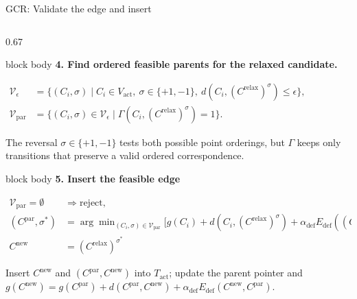 \documentclass[aspectratio=169,10pt]{beamer}
\begin{document}
\begin{frame}[t]{GCR: Validate the edge and insert}
\begin{columns}[T,onlytextwidth]
\begin{column}{0.67\textwidth}
      \vspace{0.035cm}
      \begin{beamercolorbox}[wd=\textwidth,sep=0.07cm]{block body}
        \fontsize{6.4}{6.9}\selectfont
        \textbf{4. Find ordered feasible parents for the relaxed candidate.}\par\vspace{0.2ex}
        \centering
        \(
          \begin{aligned}
            \mathcal V_{\epsilon}
              &=\{(C_i,\sigma)\mid C_i\in V_{\mathrm{act}},\ \sigma\in\{+1,-1\},\ d(C_i,(C^{\mathrm{relax}})^\sigma)\leq\epsilon\},\\[0.35ex]
            \mathcal V_{\mathrm{par}}
              &=\{(C_i,\sigma)\in\mathcal V_{\epsilon}\mid
                   \Gamma(C_i,(C^{\mathrm{relax}})^\sigma)=1\}.
          \end{aligned}
        \)
        \par\raggedright\vspace{0.2ex}
        The reversal \(\sigma\in\{+1,-1\}\) tests both possible point orderings,
        but \(\Gamma\) keeps only transitions that preserve a valid ordered correspondence.
      \end{beamercolorbox}

      \vspace{0.035cm}
      \begin{beamercolorbox}[wd=\textwidth,sep=0.07cm]{block body}
        \fontsize{6.4}{6.9}\selectfont
        \textbf{5. Insert the feasible edge}\par\vspace{0.2ex}
        \centering
        \(
          \begin{aligned}
            \mathcal V_{\mathrm{par}}=\emptyset&\Rightarrow\text{reject},\\[0.1ex]
            (C^{\mathrm{par}},\sigma^*)
              &=\arg\min_{(C_i,\sigma)\in\mathcal V_{\mathrm{par}}}
                \bigl[g(C_i)+d(C_i,(C^{\mathrm{relax}})^\sigma)
                +\alpha_{\mathrm{def}}E_{\mathrm{def}}((C^{\mathrm{relax}})^\sigma,C_i)\bigr],\\[0.1ex]
            C^{\mathrm{new}}&=(C^{\mathrm{relax}})^{\sigma^*}
          \end{aligned}
        \)
        \par\raggedright\vspace{0.2ex}
        Insert \(C^{\mathrm{new}}\) and \((C^{\mathrm{par}},C^{\mathrm{new}})\) into
        \(T_{\mathrm{act}}\); update the parent pointer and
        \(g(C^{\mathrm{new}})=g(C^{\mathrm{par}})+d(C^{\mathrm{par}},C^{\mathrm{new}})
        +\alpha_{\mathrm{def}}E_{\mathrm{def}}(C^{\mathrm{new}},C^{\mathrm{par}})\).
      \end{beamercolorbox}
    \end{column}
  \end{columns}
\end{frame}
\end{document}
